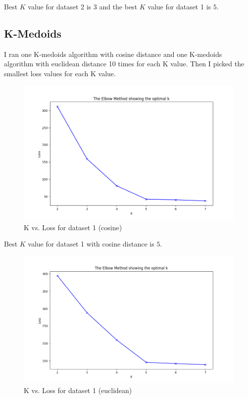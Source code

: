 \documentclass[12pt,a4paper, margin=1in]{article}
\begin{document}
Best $K$ value for dataset 2 is $3$ and the best $K$ value for dataset 1 is $5$.

\subsection{K-Medoids}

I ran one K-medoids algorithm with cosine distance and one K-medoids algorithm with euclidean distance 10 times for each K value. Then I picked the smallest loss values for each K value.

\begin{figure}[H]
    \centering
    \includegraphics[scale=0.7]{elbow_kmedoids_dataset1_cosine.png}
    \caption{K vs. Loss for dataset 1 (cosine)}
\end{figure}

Best $K$ value for dataset 1 with cosine distance is $5$.

\begin{figure}[H]
    \centering
    \includegraphics[scale=0.7]{elbow_kmedoids_dataset1_minkowski.png}
    \caption{K vs. Loss for dataset 1 (euclidean)}
\end{figure}
\end{document}
